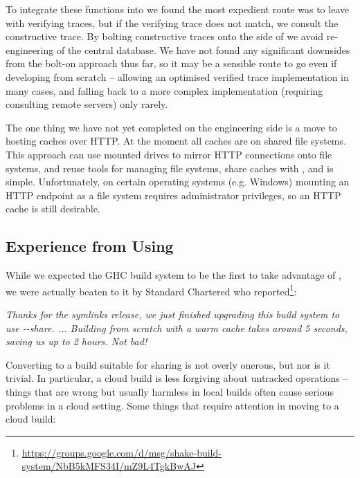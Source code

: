 To integrate these functions into \Shake we found the most expedient route was
to leave \Shake with verifying traces, but if the verifying trace does not
match, we consult the constructive trace. By bolting constructive traces onto
the side of \Shake we avoid re-engineering of the central database. We have not
found any significant downsides from the bolt-on approach thus far, so it may be
a sensible route to go even if developing from scratch -- allowing an optimised
verified trace implementation in many cases, and falling back to a more complex
implementation (requiring consulting remote servers) only rarely.

The one thing we have not yet completed on the engineering side is a move to
hosting caches over HTTP. At the moment all caches are on shared file systems.
This approach can use mounted drives to mirror HTTP connections onto file
systems, and reuse tools for managing file systems, share caches with
, and is simple. Unfortunately, on certain operating systems (e.g.
Windows) mounting an HTTP endpoint as a file system requires administrator
privileges, so an HTTP cache is still desirable.

\subsection{Experience from Using \Cloud \Shake}\label{sec-using-cloud-shake}

While we expected the GHC build system to be the first to take advantage of
\Cloud \Shake, we were actually beaten to it by Standard Chartered who
reported\footnote{\mbox{\url{https://groups.google.com/d/msg/shake-build-system/NbB5kMFS34I/mZ9L4TgkBwAJ}}}:

\vspace{1mm}
\begin{center}
\parbox{0.8 \textwidth}{\emph{Thanks for the symlinks release, we just finished
upgrading this build system to use \textsf{-}\textsf{-share}. ... Building from
scratch with a warm cache takes around 5 seconds, saving us up to 2 hours. Not
bad!}}
\end{center}
\vspace{1mm}


Converting to a build suitable for sharing is not overly onerous, but nor is it trivial.
In particular, a cloud build is less forgiving about untracked operations -- things that
are wrong but usually harmless in local builds often cause serious problems in a cloud setting.
Some things that require attention in moving to a cloud build:

